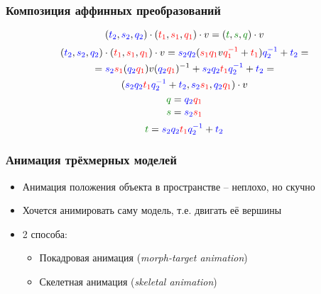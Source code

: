 \documentclass[10pt]{beamer}
\begin{document}
\begin{frame}[fragile]
\frametitle{Композиция аффинных преобразований}
\begin{equation}
({\color{blue}t_2},{\color{blue}s_2},{\color{blue}q_2}) \cdot ({\color{red}t_1},{\color{red}s_1},{\color{red}q_1}) \cdot v = ({\color{green}t},{\color{green}s},{\color{green}q}) \cdot v 
\end{equation}
\begin{multline}
({\color{blue}t_2},{\color{blue}s_2},{\color{blue}q_2}) \cdot ({\color{red}t_1},{\color{red}s_1},{\color{red}q_1}) \cdot v = {\color{blue}s_2}{\color{blue}q_2}({\color{red}s_1}{\color{red}q_1}v{\color{red}q_1^{-1}} + {\color{red}t_1}){\color{blue}q_2^{-1}} + {\color{blue}t_2} = \\
= {\color{blue}s_2}{\color{red}s_1} ({\color{blue}q_2}{\color{red}q_1}) v ({\color{blue}q_2}{\color{red}q_1})^{-1} + {\color{blue}s_2}{\color{blue}q_2}{\color{red}t_1}{\color{blue}q_2^{-1}} + {\color{blue}t_2} = \\
({\color{blue}s_2}{\color{blue}q_2}{\color{red}t_1}{\color{blue}q_2^{-1}} + {\color{blue}t_2}, {\color{blue}s_2}{\color{red}s_1}, {\color{blue}q_2}{\color{red}q_1}) \cdot v \\
\end{multline}
\begin{equation}
{\color{green}q} = {\color{blue}q_2}{\color{red}q_1}
\end{equation}
\begin{equation}
{\color{green}s} = {\color{blue}s_2}{\color{red}s_1}
\end{equation}
\begin{equation}
{\color{green}t} = {\color{blue}s_2}{\color{blue}q_2}{\color{red}t_1}{\color{blue}q_2^{-1}} + {\color{blue}t_2}
\end{equation}
\end{frame}

\begin{frame}[fragile]
\frametitle{Анимация трёхмерных моделей}
\begin{itemize}
\item Анимация положения объекта в пространстве -- неплохо, но скучно
\pause
\item Хочется анимировать саму модель, т.е. двигать её вершины
\pause
\item 2 способа:
\begin{itemize}
\item Покадровая анимация (\textit{morph-target animation})
\item Скелетная анимация (\textit{skeletal animation})
\end{itemize}
\end{itemize}
\end{frame}
\end{document}
